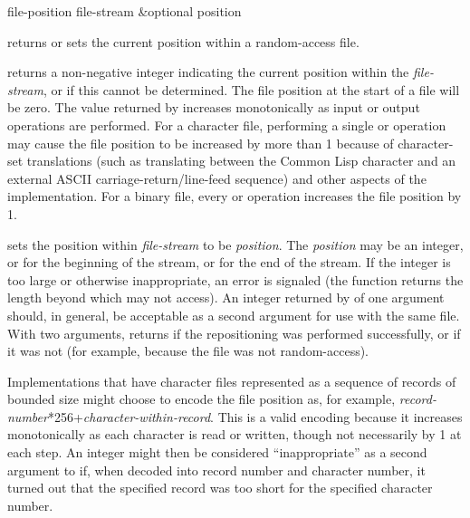 \begin{defun}[Function]
file-position file-stream &optional position

 returns or sets the current position within
a random-access file.

 returns a non-negative integer
indicating the current position within the \emph{file-stream}, or {\false} if
this cannot be determined.  The file position at the start of a file will
be zero.  The value returned by  increases monotonically
as input or output operations are performed.  For a character file,
performing a single  or  operation
may cause the file position to be increased by more than 1 because of
character-set translations (such as translating between the Common Lisp
 character and an external {ASCII}
carriage-return/line-feed sequence) and other aspects of the
implementation.  For a binary file, every  or 
operation increases the file position by 1.

 sets the position within
\emph{file-stream} to be \emph{position}.  The \emph{position} may be an integer,
or  for the beginning of the stream, or  for the end of the
stream.
If the integer is too large or otherwise inappropriate, an error
is signaled (the  function returns the length beyond
which  may not access).  An integer returned by
 of one argument should, in general, be acceptable
as a second argument for use with the same file.
With two arguments,
 returns {\true} if the repositioning was performed
successfully, or {\false} if it was not (for example,
because the file was not random-access).

\begin{implementation}
Implementations that have character files represented
as a sequence of records of bounded size might choose to encode the
file position as, for example,
\emph{record-number}*256+\emph{character-within-record}.
This is a valid encoding because it increases monotonically as
each character is read or written, though not necessarily by 1 at
each step.  An integer might then be considered ``inappropriate''
as a second argument to  if, when decoded into
record number and character number, it turned out that the
specified record was too short for the specified character number.
\end{implementation}
\end{defun}

